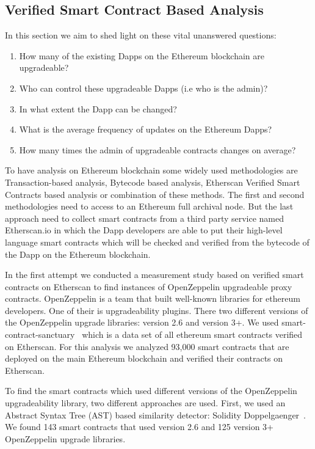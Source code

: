 \subsection{Verified Smart Contract Based Analysis}
In this section we aim to shed light on these vital unanswered questions: 
 \begin{enumerate}
  \item How many of the existing Dapps on the Ethereum blockchain are upgradeable?
  \item Who can control these upgradeable Dapps (i.e who is the admin)? 
  \item In what extent the Dapp can be changed?
  \item What is the average frequency of updates on the Ethereum Dapps?
  \item How many times the admin of upgradeable contracts changes on average?
\end{enumerate}
To have analysis on Ethereum blockchain some widely used methodologies are Transaction-based analysis, Bytecode based analysis, Etherscan Verified Smart Contracts based analysis or combination of these methods. The first and second methodologies need to access to an Ethereum full archival node. But the last approach need to collect smart contracts from a third party service named Etherscan.io in which the Dapp developers are able to put their high-level language smart contracts which will be checked and verified from the bytecode of the Dapp on the Ethereum blockchain.

In the first attempt we conducted a measurement study based on verified smart contracts on Etherscan to find instances of OpenZeppelin upgradeable proxy contracts. OpenZeppelin is a team that built well-known libraries for ethereum developers. One of their is upgradeability plugins. There two different versions of the OpenZeppelin upgrade libraries: version 2.6 and version 3+. 
We used smart-contract-sanctuary~\cite{smart_contract_sanctuary} which is a data set of all ethereum smart contracts verified on Etherscan. For this analysis we analyzed 93,000 smart contracts that are deployed on the main Ethereum blockchain and verified their contracts on Etherscan. 

To find the smart contracts which used different versions of the OpenZeppelin upgradeability library, two different approaches are used. First, we used an Abstract Syntax Tree (AST) based similarity detector: Solidity Doppelgaenger~\cite{solidity-doppelganger}. We found 143 smart contracts that used version 2.6 and 125 version 3+ OpenZeppelin upgrade libraries. 

